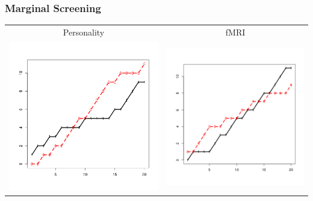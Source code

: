 \documentclass{beamer}
\begin{document}
\begin{frame}
\frametitle{Marginal Screening}

\begin{center}
\begin{tabular}{cc}
Personality & fMRI \\
\includegraphics[scale=0.15]{mar_pf16.png} & \includegraphics[scale=0.15]{mar_fMRI.png}\\

\end{tabular}
\end{center}
\end{frame}
\end{document}
